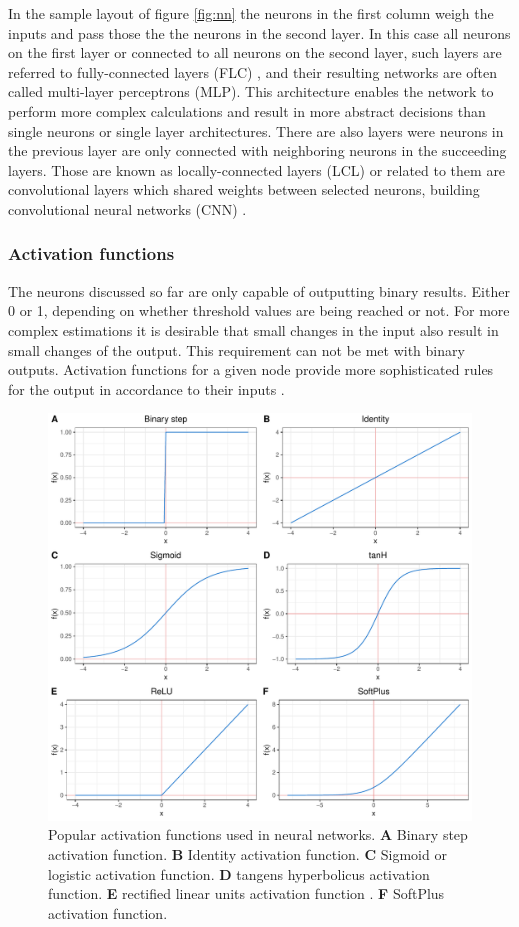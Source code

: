 In the sample layout of figure \ref{fig:nn} the neurons in the first column weigh the inputs and pass those
the the neurons in the second layer. In this case all neurons on the first layer or connected to all neurons
on the second layer, such layers are referred to fully-connected layers (FLC) , and their resulting networks
are often called multi-layer perceptrons (MLP). This architecture enables the network to perform more complex
calculations and result in more abstract decisions than single neurons or single layer architectures. There
are also layers were neurons in the previous layer are only connected with neighboring neurons in the
succeeding layers. Those are known as locally-connected layers (LCL) or related to them are convolutional
layers which shared weights between selected neurons, building convolutional neural networks (CNN) \cite{lecun1999object}.

\subsubsection{Activation functions}

The neurons discussed so far are only capable of outputting binary results. Either 0 or 1, depending on
whether threshold values are being reached or not. For more complex estimations it is desirable that small
changes in the input also result in small changes of the output. This requirement can not be met with binary
outputs. Activation functions for a given node provide more sophisticated rules for the output in accordance
to their inputs \cite{vzilinskas2006practical}.

\begin{figure}[H]
\centering
\includegraphics[height=.55\textheight, width=.85\textwidth]{Figures/activation}
\decoRule
\caption[Popular activation functions for neural networks]{Popular activation functions used in neural networks.
 \textbf{A} Binary step activation function.
 \textbf{B} Identity activation function.
 \textbf{C} Sigmoid or logistic activation function.
 \textbf{D} tangens hyperbolicus activation function.
 \textbf{E} rectified linear units activation function .
 \textbf{F} SoftPlus activation function.}
\label{fig:activation}
\end{figure}

